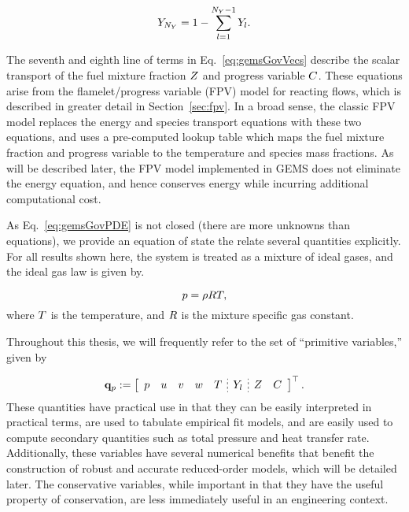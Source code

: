 \begin{equation}
	Y_{N_Y} = 1 - \sum_{l = 1}^{N_Y-1} Y_{l}.
\end{equation}

The seventh and eighth line of terms in Eq.~\ref{eq:gemsGovVecs} describe the scalar transport of the fuel mixture fraction $Z$ and progress variable $C$. These equations arise from the flamelet/progress variable (FPV) model for reacting flows, which is described in greater detail in Section~\ref{sec:fpv}. In a broad sense, the classic FPV model replaces the energy and species transport equations with these two equations, and uses a pre-computed lookup table which maps the fuel mixture fraction and progress variable to the temperature and species mass fractions. As will be described later, the FPV model implemented in GEMS does not eliminate the energy equation, and hence conserves energy while incurring additional computational cost.

As Eq.~\ref{eq:gemsGovPDE} is not closed (there are more unknowns than equations), we provide an equation of state the relate several quantities explicitly. For all results shown here, the system is treated as a mixture of ideal gases, and the ideal gas law is given by.

\begin{equation}\label{eq:idealGas}
	p = \rho R T,
\end{equation}
where $T$ is the temperature, and $R$ is the mixture specific gas constant.

Throughout this thesis, we will frequently refer to the set of ``primitive variables,'' given by

\begin{equation}\label{eq:gemsPrimVec}
    \primVec \defEq \left[
    \begin{array}{ccccc;{2pt/2pt}c;{2pt/2pt}cc}
    \pressure & \velX & \velY & \velZ & \temperature & \mfSpec & \mixFrac & \progVar
    \end{array}
    \right]^\top.
\end{equation}
These quantities have practical use in that they can be easily interpreted in practical terms, are used to tabulate empirical fit models, and are easily used to compute secondary quantities such as total pressure and heat transfer rate. Additionally, these variables have several numerical benefits that benefit the construction of robust and accurate reduced-order models, which will be detailed later. The conservative variables, while important in that they have the useful property of conservation, are less immediately useful in an engineering context.

